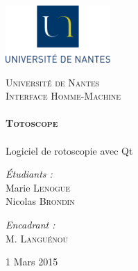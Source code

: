\begin{titlepage}
 
	 \includegraphics[width=4cm]{figures/UN.png}~\\[1cm]
	\begin{center}
    \textsc{\LARGE Université de Nantes}\\[2cm]

    \textsc{\Large Interface Homme-Machine}\\[2cm]

    \HRule \\[0.4cm]
    { \huge \bfseries \textsc{Totoscope}\\[0.4cm] }
    \HRule \\[2cm]
    
    {\LARGE Logiciel de rotoscopie avec Qt} 
	\\[6cm]

    \begin{minipage}{0.4\textwidth}
      \begin{flushleft} \large
        \emph{\'Etudiants :}\\
        Marie \textsc{Lenogue}\\
        Nicolas \textsc{Brondin}
      \end{flushleft}
    \end{minipage}
    \begin{minipage}{0.4\textwidth}
      \begin{flushright} \large
        \emph{Encadrant :}\\
         M. \textsc{Languénou}\\
      \end{flushright}
    \end{minipage}

    \vfill

    {\large 1\ier{} Mars 2015}

  \end{center}
\end{titlepage}
